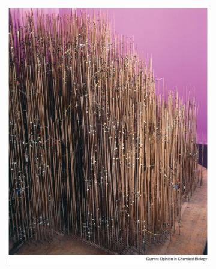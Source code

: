 \begin{figure}
\begin{subfigure}{.5\textwidth}
  \caption{}
  \label{Fig:kendrew_plasticine}
  \end{subfigure}%
  \\[\baselineskip]
  \begin{subfigure}{.5\textwidth}
  \centering
  {\includegraphics[width=0.9\linewidth]{./figures/ch1/kendrew_myoglobin_forest_of_rods}}    
  \caption{}
  \label{Fig:kendrew_myoglobin_forest_of_rods}
  \hspace{0.2cm}
  \end{subfigure}%
  \begin{subfigure}{.5\textwidth}
  \centering

\end{subfigure}
\end{figure}
